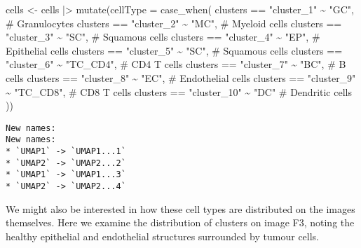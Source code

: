 \documentclass[
  letterpaper,
  DIV=11,
  numbers=noendperiod]{scrreprt}
\newenvironment{Shaded}{\begin{snugshade}}{\end{snugshade}}
\newcommand{\AttributeTok}[1]{\textcolor[rgb]{0.40,0.45,0.13}{#1}}
\newcommand{\CommentTok}[1]{\textcolor[rgb]{0.37,0.37,0.37}{#1}}
\newcommand{\FunctionTok}[1]{\textcolor[rgb]{0.28,0.35,0.67}{#1}}
\newcommand{\NormalTok}[1]{\textcolor[rgb]{0.00,0.23,0.31}{#1}}
\newcommand{\OtherTok}[1]{\textcolor[rgb]{0.00,0.23,0.31}{#1}}
\newcommand{\SpecialCharTok}[1]{\textcolor[rgb]{0.37,0.37,0.37}{#1}}
\newcommand{\StringTok}[1]{\textcolor[rgb]{0.13,0.47,0.30}{#1}}
\begin{document}
\begin{Shaded}
\begin{Highlighting}[]
\NormalTok{cells }\OtherTok{\textless{}{-}}\NormalTok{ cells }\SpecialCharTok{|\textgreater{}}
  \FunctionTok{mutate}\NormalTok{(}\AttributeTok{cellType =} \FunctionTok{case\_when}\NormalTok{(}
\NormalTok{    clusters }\SpecialCharTok{==} \StringTok{"cluster\_1"} \SpecialCharTok{\textasciitilde{}} \StringTok{"GC"}\NormalTok{, }\CommentTok{\# Granulocytes}
\NormalTok{    clusters }\SpecialCharTok{==} \StringTok{"cluster\_2"} \SpecialCharTok{\textasciitilde{}} \StringTok{"MC"}\NormalTok{, }\CommentTok{\# Myeloid cells}
\NormalTok{    clusters }\SpecialCharTok{==} \StringTok{"cluster\_3"} \SpecialCharTok{\textasciitilde{}} \StringTok{"SC"}\NormalTok{, }\CommentTok{\# Squamous cells}
\NormalTok{    clusters }\SpecialCharTok{==} \StringTok{"cluster\_4"} \SpecialCharTok{\textasciitilde{}} \StringTok{"EP"}\NormalTok{, }\CommentTok{\# Epithelial cells}
\NormalTok{    clusters }\SpecialCharTok{==} \StringTok{"cluster\_5"} \SpecialCharTok{\textasciitilde{}} \StringTok{"SC"}\NormalTok{, }\CommentTok{\# Squamous cells}
\NormalTok{    clusters }\SpecialCharTok{==} \StringTok{"cluster\_6"} \SpecialCharTok{\textasciitilde{}} \StringTok{"TC\_CD4"}\NormalTok{, }\CommentTok{\# CD4 T cells}
\NormalTok{    clusters }\SpecialCharTok{==} \StringTok{"cluster\_7"} \SpecialCharTok{\textasciitilde{}} \StringTok{"BC"}\NormalTok{, }\CommentTok{\# B cells}
\NormalTok{    clusters }\SpecialCharTok{==} \StringTok{"cluster\_8"} \SpecialCharTok{\textasciitilde{}} \StringTok{"EC"}\NormalTok{, }\CommentTok{\# Endothelial cells}
\NormalTok{    clusters }\SpecialCharTok{==} \StringTok{"cluster\_9"} \SpecialCharTok{\textasciitilde{}} \StringTok{"TC\_CD8"}\NormalTok{, }\CommentTok{\# CD8 T cells}
\NormalTok{    clusters }\SpecialCharTok{==} \StringTok{"cluster\_10"} \SpecialCharTok{\textasciitilde{}} \StringTok{"DC"} \CommentTok{\# Dendritic cells}
\NormalTok{  ))}
\end{Highlighting}
\end{Shaded}

\begin{verbatim}
New names:
New names:
* `UMAP1` -> `UMAP1...1`
* `UMAP2` -> `UMAP2...2`
* `UMAP1` -> `UMAP1...3`
* `UMAP2` -> `UMAP2...4`
\end{verbatim}

We might also be interested in how these cell types are distributed on
the images themselves. Here we examine the distribution of clusters on
image F3, noting the healthy epithelial and endothelial structures
surrounded by tumour cells.
\end{document}
